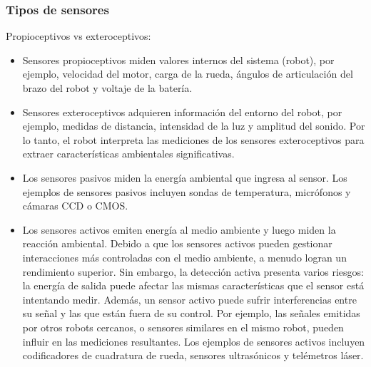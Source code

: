 \begin{frame}
    \frametitle{Tipos de sensores}
    \footnotesize
    
    Propioceptivos vs exteroceptivos:
    
    \begin{itemize}
        \item Sensores propioceptivos miden valores internos del sistema (robot), por ejemplo, velocidad del motor, carga de la rueda, ángulos de articulación del brazo del robot y voltaje de la batería.
    
        \item Sensores exteroceptivos adquieren información del entorno del robot, por ejemplo, medidas de distancia, intensidad de la luz y amplitud del sonido. Por lo tanto, el robot interpreta las mediciones de los sensores exteroceptivos para extraer características ambientales significativas.
    \end{itemize}

    \begin{itemize}
        \item Los sensores pasivos miden la energía ambiental que ingresa al sensor. Los ejemplos de sensores pasivos incluyen sondas de temperatura, micrófonos y cámaras CCD o CMOS.
    
        \item Los sensores activos emiten energía al medio ambiente y luego miden la reacción ambiental. Debido a que los sensores activos pueden gestionar interacciones más controladas con el medio ambiente, a menudo logran un rendimiento superior. Sin embargo, la detección activa presenta varios riesgos: la energía de salida puede afectar las mismas características que el sensor está intentando medir. Además, un sensor activo puede sufrir interferencias entre su señal y las que están fuera de su control. Por ejemplo, las señales emitidas por otros robots cercanos, o sensores similares en el mismo robot, pueden influir en las mediciones resultantes. Los ejemplos de sensores activos incluyen codificadores de cuadratura de rueda, sensores ultrasónicos y telémetros láser.
\end{itemize}


\end{frame}


